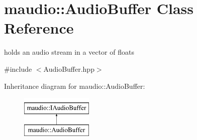 \hypertarget{classmaudio_1_1AudioBuffer}{\section{maudio\-:\-:Audio\-Buffer Class Reference}
\label{classmaudio_1_1AudioBuffer}
}


holds an audio stream in a vector of floats  




{\ttfamily \#include $<$Audio\-Buffer.\-hpp$>$}

Inheritance diagram for maudio\-:\-:Audio\-Buffer\-:\begin{figure}[H]
\begin{center}
\leavevmode
\includegraphics[height=2.000000cm]{classmaudio_1_1AudioBuffer}
\end{center}
\end{figure}
